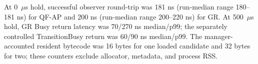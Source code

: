 At 0~$\mu$s hold, successful observer round-trip was 181 ns (run-median range 180--181 ns) for QF-AP and 200 ns (run-median range 200--220 ns) for GR. At 500~$\mu$s hold, GR Busy return latency was 70/270 ns median/p99; the separately controlled TransitionBusy return was 60/90 ns median/p99. The manager-accounted resident bytecode was 16 bytes for one loaded candidate and 32 bytes for two; these counters exclude allocator, metadata, and process RSS.
